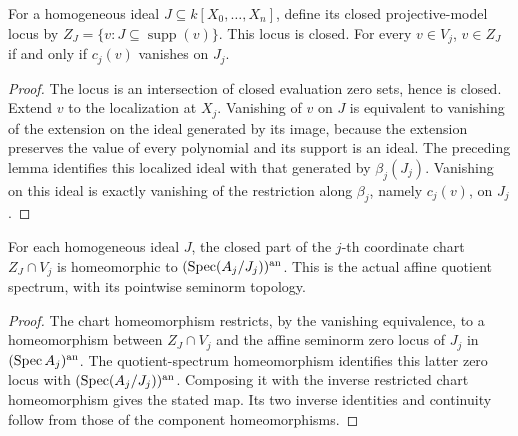 \begin{lemma}
\label{closed-charts:vanishing}
\leanok
{}
For a homogeneous ideal $J\subseteq k[X_0,\ldots,X_n]$, define its closed
projective-model locus by $Z_J=\{v:J\subseteq\operatorname{supp}(v)\}$.
This locus is closed. For every $v\in V_j$,
$v\in Z_J$ if and only if $c_j(v)$ vanishes on $J_j$.
\end{lemma}
\begin{proof}
The locus is an intersection of closed evaluation zero sets, hence is closed.
Extend $v$ to the localization at $X_j$. Vanishing of $v$ on $J$ is equivalent
to vanishing of the extension on the ideal generated by its image, because the
extension preserves the value of every polynomial and its support is an ideal.
The preceding lemma identifies this localized ideal with that generated by
$\beta_j(J_j)$. Vanishing on this ideal is exactly vanishing of the restriction
along $\beta_j$, namely $c_j(v)$, on $J_j$.
\end{proof}

\begin{theorem}
\label{closed-charts:quotient-homeomorphism}
\leanok
{}
For each homogeneous ideal $J$, the closed part of the $j$-th coordinate chart
$Z_J\cap V_j$ is homeomorphic to $(\operatorname{Spec}(A_j/J_j))^{\mathrm{an}}$.
This is the actual affine quotient spectrum, with its pointwise seminorm topology.
\end{theorem}
\begin{proof}
The chart homeomorphism restricts, by the vanishing equivalence, to a homeomorphism
between $Z_J\cap V_j$ and the affine seminorm zero locus of $J_j$ in
$(\operatorname{Spec} A_j)^{\mathrm{an}}$. The quotient-spectrum homeomorphism identifies this latter
zero locus with $(\operatorname{Spec}(A_j/J_j))^{\mathrm{an}}$. Composing it with the inverse restricted
chart homeomorphism gives the stated map. Its two inverse identities and continuity
follow from those of the component homeomorphisms.
\end{proof}
